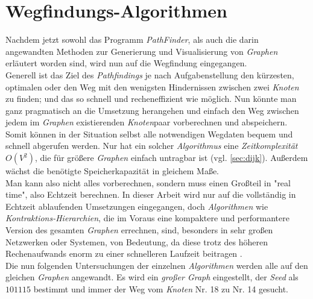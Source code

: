 \documentclass[12pt]{article}
\begin{document}
\section{Wegfindungs-Algorithmen}
Nachdem jetzt sowohl das Programm \textit{PathFinder}, als auch die darin angewandten Methoden zur Generierung und Visualisierung von \textit{Graphen} erläutert worden sind, wird nun auf die Wegfindung eingegangen.
\\
Generell ist das Ziel des \textit{Pathfindings} je nach Aufgabenstellung den kürzesten, optimalen oder den Weg mit den wenigsten Hindernissen zwischen zwei \textit{Knoten} zu finden; und das so schnell und recheneffizient wie möglich. Nun könnte man ganz pragmatisch an die Umsetzung herangehen und einfach den Weg zwischen jedem im \textit{Graphen} existierenden \textit{Knoten}paar vorberechnen und abspeichern. Somit können in der Situation selbst alle notwendigen Wegdaten bequem und schnell abgerufen werden. Nur hat ein solcher \textit{Algorithmus} eine \textit{Zeitkomplexität} $O(V^2)$, die für größere \textit{Graphen} einfach untragbar ist (vgl. \autoref{sec:dijk}). Außerdem wächst die benötigte Speicherkapazität in gleichem Maße.
\\
Man kann also nicht alles vorberechnen, sondern muss einen Großteil in "real time", also Echtzeit berechnen. In dieser Arbeit wird nur auf die vollständig in Echtzeit ablaufenden Umsetzungen eingegangen, doch \textit{Algorithmen} wie \textit{Kontraktions-Hierarchien}, die im Voraus eine kompaktere und performantere Version des gesamten \textit{Graphen} errechnen, sind, besonders in sehr großen Netzwerken oder Systemen, von Bedeutung, da diese trotz des höheren Rechenaufwands enorm zu einer schnelleren Laufzeit beitragen \cite{contr-hier}.
\\
Die nun folgenden Untersuchungen der einzelnen \textit{Algorithmen} werden alle auf den gleichen \textit{Graphen} angewandt. Es wird ein \textit{großer Graph} eingestellt, der \textit{Seed} als $101115$ bestimmt und immer der Weg vom \textit{Knoten} Nr. 18 zu Nr. 14 gesucht.
\end{document}
